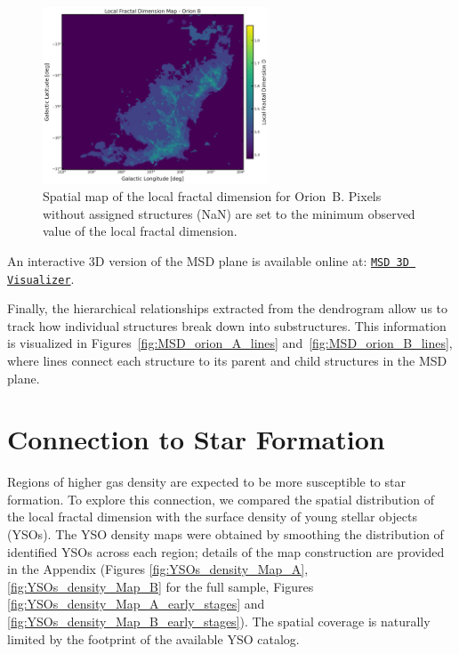 \begin{figure}[t]
    \centering
    \includegraphics[width=0.6\textwidth]{figures/local_fractal_dimension_map_Orion_B.png}
    \caption{Spatial map of the local fractal dimension for Orion~B. Pixels without assigned structures (NaN) are set to the minimum observed value of the local fractal dimension.}
    \label{fig:local_B_map}
\end{figure}

An interactive 3D version of the MSD plane is available online at:  
\href{https://simonesped.github.io/MSD_Viz/}{\texttt{MSD 3D Visualizer}}.

Finally, the hierarchical relationships extracted from the dendrogram allow us to track how individual structures break down into substructures.  
This information is visualized in Figures~\ref{fig:MSD_orion_A_lines} and~\ref{fig:MSD_orion_B_lines}, where lines connect each structure to its parent and child structures in the MSD plane.

\section{Connection to Star Formation}

Regions of higher gas density are expected to be more susceptible to star formation.  
To explore this connection, we compared the spatial distribution of the local fractal dimension with the surface density of young stellar objects (YSOs).  
The YSO density maps were obtained by smoothing the distribution of identified YSOs across each region; details of the map construction are provided in the Appendix (Figures \ref{fig:YSOs_density_Map_A}, \ref{fig:YSOs_density_Map_B} for the full sample, Figures \ref{fig:YSOs_density_Map_A_early_stages} and \ref{fig:YSOs_density_Map_B_early_stages}).  
The spatial coverage is naturally limited by the footprint of the available YSO catalog.

